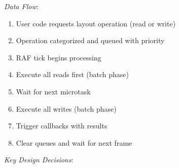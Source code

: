 \documentclass[11pt]{article}
\begin{document}
\emph{Data Flow}:

\begin{enumerate}
\item User code requests layout operation (read or write)
\item Operation categorized and queued with priority
\item RAF tick begins processing
\item Execute all reads first (batch phase)
\item Wait for next microtask
\item Execute all writes (batch phase)
\item Trigger callbacks with results
\item Clear queues and wait for next frame
\end{enumerate}

\emph{Key Design Decisions}:
\end{document}
